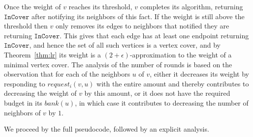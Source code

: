 \documentclass[11pt]{article}
\newcommand{\Deal}{request}
\newcommand{\Bank}{bank}
\newcommand{\InCover}{\texttt{InCover}}
\begin{document}
Once the weight of $v$ reaches its threshold, $v$ completes its algorithm, returning $\InCover$ after notifying its neighbors of this fact. If the weight is still above the threshold then $v$ only removes its edges to neighbors that notified they are returning $\InCover$. This gives that each edge has at least one endpoint returning $\InCover$, and hence the set of all such vertices is a vertex cover, and by Theorem~\ref{thm:lr} its weight is a $(2+\epsilon)$-approximation to the weight of a minimal vertex cover. The analysis of the number of rounds is based on the observation that for each of the neighbors $u$ of $v$, either it decreases its weight by responding to $\Deal_i(v,u)$ with the entire amount and thereby contributes to decreasing the weight of $v$ by this amount, or it does not have the required budget in its $\Bank(u)$, in which case it contributes to decreasing the number of neighbors of $v$ by $1$.

We proceed by the full pseudocode, followed by an explicit analysis.
\end{document}
